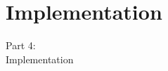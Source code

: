 \section{Implementation}
\begin{frame}
  \vspace{25mm}
  \begin{center}
    \Huge{Part 4:\\Implementation}
  \end{center}
\end{frame}
